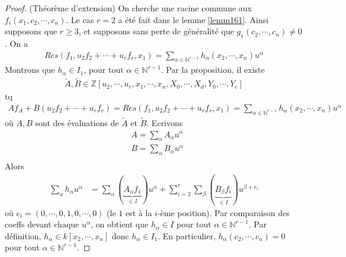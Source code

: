                 \begin{proof} (Théorème d'extension)
                    On cherche une racine commune aux $f_i(x_1, c_2, \cdots, c_n)$. Le cas $r = 2$ a été fait dans le lemme \ref{lemm161}. Ainsi supposons que $r \geq 3$, et supposons sans perte de généralité que $g_1(c_2, \cdots, c_n) \neq 0$. On a
                    \begin{align*}
                        Res(f_1, u_2f_2 + \cdots + u_rf_r, x_1) = \sum_{\alpha \in \mathbb{N}^{r-1}} h_\alpha(x_2, \cdots, x_n) u^\alpha 
                    \end{align*}
                    Montrons que $h_{\alpha} \in I_1$, pour tout $\alpha \in \mathbb{N}^{r-1}$. Par la proposition, il existe
                    \begin{align*}
                        \tilde A, \tilde B \in \mathbb{Z}[u_2, \cdots, u_r, x_1, \cdots, x_n, X_0, \cdots, X_d, Y_0, \cdots, Y_e]
                    \end{align*}
                    tq 
                    \begin{align*}
                        Af_A + B(u_2f_2 + \cdots + u_rf_r) = Res(f_1, u_2f_2 + \cdots + u_rf_r, x_1)
                        = \sum_{\alpha \in \mathbb{N}^{r-1}} h_\alpha(x_2, \cdots, x_n) u^\alpha 
                    \end{align*}
                    où $A,B$ sont des évaluations de $\tilde A$ et $\tilde B$. Ecrivons
                    \begin{align*}
                        &A = \sum_{\alpha} A_\alpha u^\alpha \\
                        &B = \sum_{\alpha} B_\alpha u^\alpha \\
                    \end{align*}
                    Alors
                    \begin{align*}
                        \sum_\alpha h_\alpha u^\alpha &= \sum_\alpha (\underbrace{A_\alpha f_1}_{\in I}) u^\alpha + \sum_{i = 2}^r \sum_\beta (\underbrace{B_\beta f_i}_{\in I}) u^{\beta + e_i} 
                    \end{align*}
                    où $e_i = (0, \cdots, 0, 1, 0, \cdots, 0)$ (le $1$ est à la $i$-ème position). Par comparaison des coeffs devant chaque $u^\alpha$, on obtient que $h_\alpha \in I$ pour tout $\alpha \in \mathbb{N}^{r-1}$. Par définition, $h_\alpha \in k[x_2, \cdots, x_n]$ donc $h_\alpha \in I_1$. En particulier, $h_\alpha(c_2, \cdots, c_n) = 0$ pour tout $\alpha \in \mathbb{N}^{r-1}$.

\end{proof}
